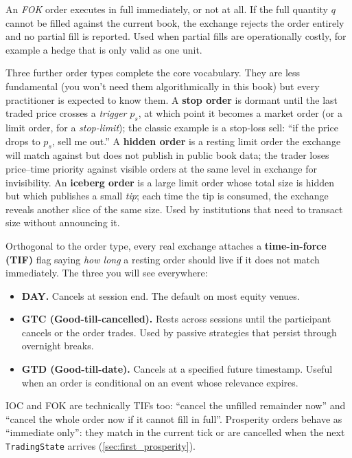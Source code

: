 \begin{definition}
An \emph{FOK} order executes in full immediately, or not at all. If
the full quantity $q$ cannot be filled against the current book, the
exchange rejects the order entirely and no partial fill is reported.
Used when partial fills are operationally costly, for example
a hedge that is only valid as one unit.
\end{definition}

Three further order types complete the core vocabulary. They are less
fundamental (you won't need them algorithmically in this book) but
every practitioner is expected to know them. A \textbf{stop order} is
dormant until the last traded price crosses a \emph{trigger} $p_s$,
at which point it becomes a market order (or a limit order, for a
\emph{stop-limit}); the classic example is a stop-loss sell: ``if
the price drops to $p_s$, sell me out.'' A \textbf{hidden order} is a
resting limit order the exchange will match against but does not
publish in public book data; the trader loses price--time priority
against visible orders at the same level in exchange for invisibility.
An \textbf{iceberg order} is a large limit order whose total size is
hidden but which publishes a small \emph{tip}; each time the tip is
consumed, the exchange reveals another slice of the same size. Used
by institutions that need to transact size without announcing it.

Orthogonal to the order type, every real exchange attaches a
\textbf{time-in-force (TIF)} flag saying \emph{how long} a resting
order should live if it does not match immediately. The three you
will see everywhere:

\begin{itemize}
  \item \textbf{DAY.} Cancels at session end. The default on most
  equity venues.
  \item \textbf{GTC (Good-till-cancelled).} Rests across sessions
  until the participant cancels or the order trades. Used by passive
  strategies that persist through overnight breaks.
  \item \textbf{GTD (Good-till-date).} Cancels at a specified future
  timestamp. Useful when an order is conditional on an event whose
  relevance expires.
\end{itemize}

IOC and FOK are technically TIFs too: ``cancel the unfilled remainder
now'' and ``cancel the whole order now if it cannot fill in full''.
Prosperity orders behave as ``immediate only'': they match in the
current tick or are cancelled when the next \texttt{TradingState}
arrives (\cref{sec:first_prosperity}).

